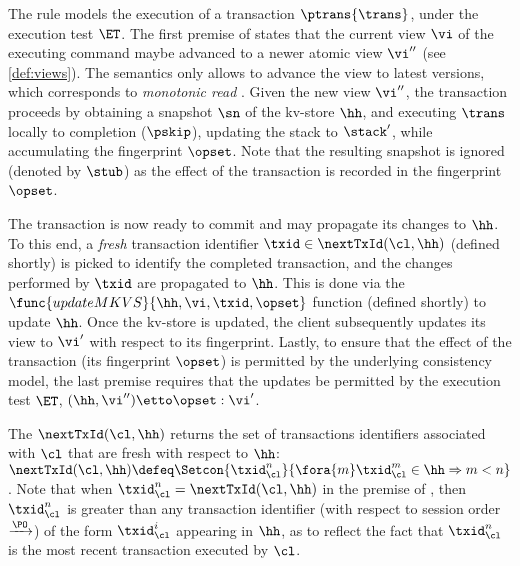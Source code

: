 The  rule models the execution of a transaction $\ptrans{\trans}$, under the execution test $\ET$. 
The first premise of  states that the current view $\vi$ of the executing command maybe advanced to a newer atomic view $\vi''$ (see \cref{def:views}). 
The semantics only allows to advance the view to latest versions, which corresponds to \emph{monotonic read} \cite{.......}.
Given the new view $\vi''$, the transaction proceeds by obtaining a snapshot $\sn$ of the kv-store $\hh$, and executing $\trans$ locally to completion ($\pskip$), updating the stack to $\stack'$, while accumulating the fingerprint $\opset$. Note that the resulting snapshot is ignored (denoted by $\stub$) as the effect of the transaction is recorded in the fingerprint $\opset$. 
%

The transaction is now ready to commit and may propagate its changes to $\hh$.
To this end, a \emph{fresh} transaction identifier $\txid \in \nextTxId(\cl, \hh)$ (defined shortly) is picked
to identify the completed transaction, and the changes performed by $\txid$ are propagated to $\hh$. 
This is done via the $\func{updateMKVS}{\hh, \vi, \txid, \opset}$ function (defined shortly) to update $\hh$. 
Once the kv-store is updated, the client subsequently updates its view to $\vi'$ with respect to its fingerprint. 
Lastly, to ensure that the effect of the transaction (its fingerprint  $\opset$) is permitted by the underlying consistency model, 
the last premise requires that the updates be permitted by the execution test $\ET$, \ie \( (\hh, \vi'') \etto \opset : \vi'\).

The $\nextTxId(\cl, \hh)$ returns the set of transactions identifiers associated with $\cl$ that are fresh with respect to $\hh$: 
$\nextTxId(\cl, \hh) \defeq \Setcon{\txid_{\cl}^{n}}{\fora{m} \txid_{\cl}^{m} \in \hh \Rightarrow m < n }$.
Note that when $\txid_\cl^n = \nextTxId(\cl, \hh)$ in the premise of , then $\txid_\cl^n$ is greater than any transaction identifier 
(with respect to session order $\xrightarrow{\PO}$) 
of the form $\txid_{\cl}^{i}$ appearing in $\hh$,
as to reflect the fact that $\txid_\cl^n$ is the most recent transaction executed by $\cl$.

